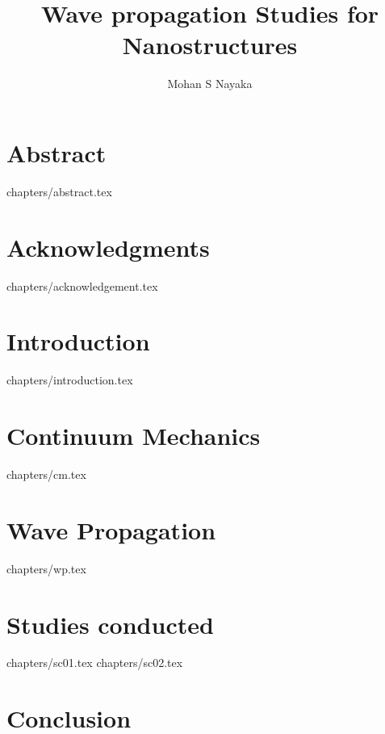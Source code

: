 \documentclass[12pt,a4paper,oneside,openright,titlepage]{report}
\author{Mohan S Nayaka}
\title{Wave propagation Studies for Nanostructures}
\begin{document}
\pagestyle{empty}




\pagestyle{headings}
\tableofcontents
\listoffigures
\chapter* {Abstract}
 {chapters/abstract.tex}
\chapter* {Acknowledgments}
 {chapters/acknowledgement.tex}
\chapter {Introduction}
 {chapters/introduction.tex}
\chapter {Continuum Mechanics}
 {chapters/cm.tex}
\chapter {Wave Propagation}
 {chapters/wp.tex}
\chapter {Studies conducted}
 {chapters/sc01.tex}
 {chapters/sc02.tex}
\chapter{Conclusion}



\end{document}
